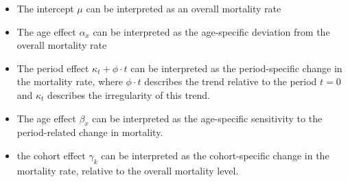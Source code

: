 \begin{itemize}
    \item The intercept $\mu$ can be interpreted as an overall mortality rate
    \item The age effect $\alpha_x$ can be interpreted as the age-specific deviation from the overall mortality rate
    \item The period effect $\kappa_t + \phi \cdot t$ can be interpreted as the period-specific change in the mortality rate, where $\phi \cdot t$ describes the trend relative to the period $t = 0$ and $\kappa_t$ describes the irregularity of this trend. 
    \item The age effect $\beta_x$ can be interpreted as the age-specific sensitivity to the period-related change in mortality. 
    \item the cohort effect $\gamma_k$ can be interpreted as the cohort-specific change in the mortality rate, relative to the overall mortality level. 
\end{itemize}
